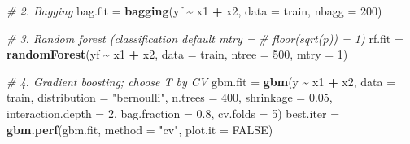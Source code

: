 \documentclass[
]{book}
\newenvironment{Shaded}{\begin{snugshade}}{\end{snugshade}}
\newcommand{\AttributeTok}[1]{\textcolor[rgb]{0.13,0.29,0.53}{#1}}
\newcommand{\CommentTok}[1]{\textcolor[rgb]{0.56,0.35,0.01}{\textit{#1}}}
\newcommand{\ConstantTok}[1]{\textcolor[rgb]{0.56,0.35,0.01}{#1}}
\newcommand{\DecValTok}[1]{\textcolor[rgb]{0.00,0.00,0.81}{#1}}
\newcommand{\FloatTok}[1]{\textcolor[rgb]{0.00,0.00,0.81}{#1}}
\newcommand{\FunctionTok}[1]{\textcolor[rgb]{0.13,0.29,0.53}{\textbf{#1}}}
\newcommand{\NormalTok}[1]{#1}
\newcommand{\OtherTok}[1]{\textcolor[rgb]{0.56,0.35,0.01}{#1}}
\newcommand{\SpecialCharTok}[1]{\textcolor[rgb]{0.81,0.36,0.00}{\textbf{#1}}}
\newcommand{\StringTok}[1]{\textcolor[rgb]{0.31,0.60,0.02}{#1}}
\begin{document}
\begin{Shaded}
\begin{Highlighting}[]
\CommentTok{\# 2. Bagging}
\NormalTok{bag.fit }\OtherTok{=} \FunctionTok{bagging}\NormalTok{(yf }\SpecialCharTok{\textasciitilde{}}\NormalTok{ x1 }\SpecialCharTok{+}\NormalTok{ x2, }\AttributeTok{data =}\NormalTok{ train, }\AttributeTok{nbagg =} \DecValTok{200}\NormalTok{)}

\CommentTok{\# 3. Random forest (classification default mtry =}
\CommentTok{\# floor(sqrt(p)) = 1)}
\NormalTok{rf.fit }\OtherTok{=} \FunctionTok{randomForest}\NormalTok{(yf }\SpecialCharTok{\textasciitilde{}}\NormalTok{ x1 }\SpecialCharTok{+}\NormalTok{ x2, }\AttributeTok{data =}\NormalTok{ train, }\AttributeTok{ntree =} \DecValTok{500}\NormalTok{,}
    \AttributeTok{mtry =} \DecValTok{1}\NormalTok{)}

\CommentTok{\# 4. Gradient boosting; choose T by CV}
\NormalTok{gbm.fit }\OtherTok{=} \FunctionTok{gbm}\NormalTok{(y }\SpecialCharTok{\textasciitilde{}}\NormalTok{ x1 }\SpecialCharTok{+}\NormalTok{ x2, }\AttributeTok{data =}\NormalTok{ train, }\AttributeTok{distribution =} \StringTok{"bernoulli"}\NormalTok{,}
    \AttributeTok{n.trees =} \DecValTok{400}\NormalTok{, }\AttributeTok{shrinkage =} \FloatTok{0.05}\NormalTok{, }\AttributeTok{interaction.depth =} \DecValTok{2}\NormalTok{, }\AttributeTok{bag.fraction =} \FloatTok{0.8}\NormalTok{,}
    \AttributeTok{cv.folds =} \DecValTok{5}\NormalTok{)}
\NormalTok{best.iter }\OtherTok{=} \FunctionTok{gbm.perf}\NormalTok{(gbm.fit, }\AttributeTok{method =} \StringTok{"cv"}\NormalTok{, }\AttributeTok{plot.it =} \ConstantTok{FALSE}\NormalTok{)}
\end{Highlighting}
\end{Shaded}
\end{document}
